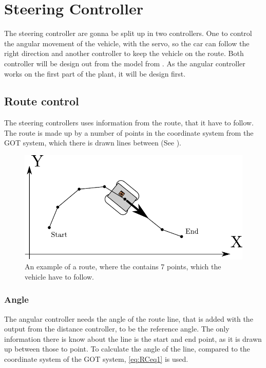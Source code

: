 \section{Steering Controller}\label{sec:steeringController}
The steering controller are gonna be split up in two controllers. One to control the angular movement of the vehicle, with the servo, so the car can follow the right direction and another controller to keep the vehicle on the route. Both controller will be design out from the model from . As the angular controller works on the first part of the plant, it will be design first.





\subsection{Route control}
The steering controllers uses information from the route, that it have to follow. The route is made up by a number of points in the coordinate system from the GOT system, which there is drawn lines between (See ).

\begin{figure}[H]
 	\centering
 	\includegraphics[scale=0.7]{figures/stepsGoT}
 	\caption{An example of a route, where the contains 7 points, which the vehicle have to follow.}
 	\label{fig:RCfig1}
\end{figure}

\subsubsection{Angle}
The angular controller needs the angle of the route line, that is added with the output from the distance controller, to be the reference angle. The only information there is know about the line is the start and end point, as it is drawn up between those to point. To calculate the angle of the line, compared to the coordinate system of the GOT system, \eqref{eq:RCeq1} is used.

